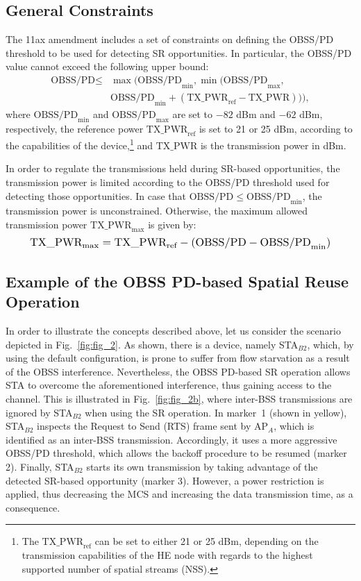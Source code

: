 \documentclass[conference]{IEEEtran}
\begin{document}
	\subsection{General Constraints}
	The 11ax amendment includes a set of constraints on defining the OBSS/PD threshold to be used for detecting SR opportunities. In particular, the OBSS/PD value cannot exceed the following upper bound:
	\begin{align}\nonumber \text{OBSS/PD} \leq & \max\Big(\text{OBSS/PD}_{\min}, \min\big(\text{OBSS/PD}_{\max},\\ & \text{OBSS/PD}_{\min} + (\text{TX\_PWR}_{\text{ref}}-\text{TX\_PWR})\big)\Big), \nonumber \end{align}
	where $\text{OBSS/PD}_{\min}$ and $\text{OBSS/PD}_{\max}$ are set to $-82$ dBm and $-62$ dBm, respectively, the reference power $\text{TX\_PWR}_{\text{ref}}$ is set to 21 or 25 dBm, according to the
	capabilities of the device,\footnote{The $\text{TX\_PWR}_{\text{ref}}$ can be set to either 21 or 25 dBm, depending on the transmission capabilities of the HE node with regards to the highest supported number of spatial streams (NSS).} and $\text{TX\_PWR}$ is the transmission power in dBm.
	
	In order to regulate the transmissions held during SR-based opportunities, the transmission power is limited according to the OBSS/PD threshold used for detecting those opportunities. In case that $\text{OBSS/PD} \leq \text{OBSS/PD}_{\min}$, the transmission power is unconstrained. Otherwise, the maximum allowed transmission power $\text{TX\_PWR}_{\max}$ is given by:
	\begin{equation}
	\resizebox{.9\columnwidth}{!}{$\text{TX\_PWR}_{\max} = \text{TX\_PWR}_{\text{ref}} - (\text{OBSS/PD} -\text{OBSS/PD}_{\min})$}
	\label{eq:power_restriction}
	\end{equation}
		
	\subsection{Example of the OBSS PD-based Spatial Reuse Operation}

	In order to illustrate the concepts described above, let us consider the scenario depicted in Fig.~\ref{fig:fig_2}. As shown, there is a device, namely STA$_{B2}$, which, by using the default configuration, is prone to suffer from flow starvation as a result of the OBSS interference. Nevertheless, the OBSS PD-based SR operation allows STA to overcome the aforementioned interference, thus gaining access to the channel. This is illustrated in Fig.~\ref{fig:fig_2b}, where inter-BSS transmissions are ignored by STA$_{B2}$ when using the SR operation. In marker~1 (shown in yellow), STA$_{B2}$ inspects the Request to Send (RTS) frame sent by AP$_A$, which is identified as an inter-BSS transmission. Accordingly, it uses a more aggressive OBSS/PD threshold, which allows the backoff procedure to be resumed (marker 2). Finally, STA$_{B2}$ starts its own transmission by taking advantage of the detected SR-based opportunity (marker 3). However, a power restriction is applied, thus decreasing the MCS and increasing the data transmission time, as a consequence.
	
\end{document}
